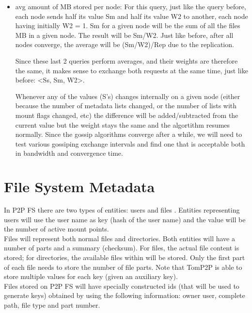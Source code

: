 \documentclass[times,9pt,article]{llncs}
\begin{document}
\begin{itemize}
\item avg amount of MB stored per node:
For this query, just like the query before, each node sends half its value Sm and 
half its value W2 to another, each node having initially W2 = 1. Sm for a given node
will be the sum of all the files MB in a given node. The result will be Sm/W2. Just
like before, after all nodes converge, the average will be (Sm/W2)/Rep due to the 
replication.

Since these last 2 queries perform averages, and their weights are therefore the same,
it makes sense to exchange both requests at the same time, just like before:
\textless Ss, Sm, W2\textgreater.

Whenever any of the values (S's) changes internally on a given node (either because
the number of metadata lists changed, or the number of lists with mount flags changed,
etc) the difference will be added/subtracted from the current value but the weight 
stays the same and the algortithm resumes normally.
Since the gossip algorithms converge after a while, we will need to test various
gossiping exchange intervals and find one that is acceptable both in bandwidth and
convergence time.

\end{itemize} 

\section{File System Metadata}

In P2P FS there are two types of entities: users and files . Entities representing
users will use the user name as key (hash of the user name) and the value will 
be the number of active mount points. \\
Files will represent both normal files and directories. Both entities will have 
a number of parts and a summary (checksum). For files, the actual file content
is stored; for directories, the available files within will be stored. Only the
first part of each file needs to store the number of file parts. Note that 
TomP2P is able to store multiple values for each key (given an auxiliary key).   \\
Files stored on P2P FS will have specially constructed ids (that will be used to
generate keys) obtained by using the following information: owner user, complete 
path, file type and part number.
\end{document}
